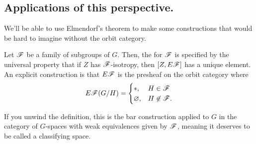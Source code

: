 \subsection*{Applications of this perspective.}
We'll be able to use Elmendorf's theorem to make some constructions that would be hard to imagine without the orbit
category.
\begin{defn}
Let $\mathscr F$ be a family of subgroups of $G$. Then, the  for $\mathscr F$ is specified by the
universal property that if $Z$ has $\mathscr F$-isotropy, then $[Z, E\mathscr F]$ has a unique element. An explicit construction
is that $E\mathscr F$ is the presheaf on the orbit category where
\[E\mathscr F(G/H) =
\begin{cases}
	*, &H\in\mathscr F\\
	\varnothing, &H\not\in\mathscr F.
\end{cases}\]
\end{defn}
If you unwind the definition, this is the bar construction applied to $G$ in the category of $G$-spaces with weak
equivalences given by $\mathscr F$, meaning it deserves to be called a classifying space.

